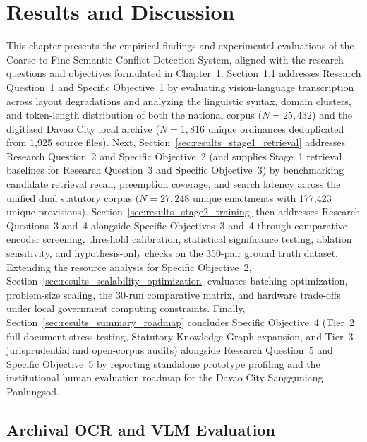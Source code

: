 
\chapter{Results and Discussion}
\label{chap:results_and_discussion}

This chapter presents the empirical findings and experimental evaluations of the Coarse-to-Fine Semantic Conflict Detection System, aligned with the research questions and objectives formulated in Chapter~1. Section~\ref{sec:results_ocr_evaluation} addresses Research Question~1 and Specific Objective~1 by evaluating vision-language transcription across layout degradations and analyzing the linguistic syntax, domain clusters, and token-length distribution of both the national corpus ($N = 25,432$) and the digitized Davao City local archive ($N = 1,816$ unique ordinances deduplicated from 1,925 source files). Next, Section~\ref{sec:results_stage1_retrieval} addresses Research Question~2 and Specific Objective~2 (and supplies Stage~1 retrieval baselines for Research Question~3 and Specific Objective~3) by benchmarking candidate retrieval recall, preemption coverage, and search latency across the unified dual statutory corpus ($N = 27,248$ unique enactments with 177,423 unique provisions). Section~\ref{sec:results_stage2_training} then addresses Research Questions~3 and~4 alongside Specific Objectives~3 and~4 through comparative encoder screening, threshold calibration, statistical significance testing, ablation sensitivity, and hypothesis-only checks on the 350-pair ground truth dataset. Extending the resource analysis for Specific Objective~2, Section~\ref{sec:results_scalability_optimization} evaluates batching optimization, problem-size scaling, the 30-run comparative matrix, and hardware trade-offs under local government computing constraints. Finally, Section~\ref{sec:results_summary_roadmap} concludes Specific Objective~4 (Tier~2 full-document stress testing, Statutory Knowledge Graph expansion, and Tier~3 jurisprudential and open-corpus audits) alongside Research Question~5 and Specific Objective~5 by reporting standalone prototype profiling and the institutional human evaluation roadmap for the Davao City Sangguniang Panlungsod.


\section{Archival OCR and VLM Evaluation}
\label{sec:results_ocr_evaluation}

